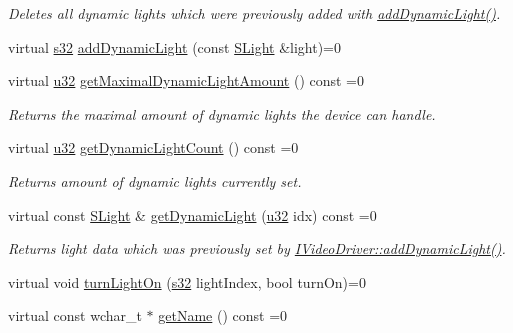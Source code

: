 \begin{DoxyCompactItemize}
\begin{DoxyCompactList}\small\item\em Deletes all dynamic lights which were previously added with \hyperlink{classirr_1_1video_1_1IVideoDriver_a813a39352eae26c4d30b5882618639be}{add\+Dynamic\+Light()}. \end{DoxyCompactList}\item 
virtual \hyperlink{namespaceirr_ac66849b7a6ed16e30ebede579f9b47c6}{s32} \hyperlink{classirr_1_1video_1_1IVideoDriver_a813a39352eae26c4d30b5882618639be}{add\+Dynamic\+Light} (const \hyperlink{structirr_1_1video_1_1SLight}{S\+Light} \&light)=0
\item 
virtual \hyperlink{namespaceirr_a0416a53257075833e7002efd0a18e804}{u32} \hyperlink{classirr_1_1video_1_1IVideoDriver_a242c9e9d469476eb28d55dc8a17b6622}{get\+Maximal\+Dynamic\+Light\+Amount} () const  =0
\begin{DoxyCompactList}\small\item\em Returns the maximal amount of dynamic lights the device can handle. \end{DoxyCompactList}\item 
virtual \hyperlink{namespaceirr_a0416a53257075833e7002efd0a18e804}{u32} \hyperlink{classirr_1_1video_1_1IVideoDriver_a4c85208c572dc8c37350bf0bd11583f8}{get\+Dynamic\+Light\+Count} () const  =0
\begin{DoxyCompactList}\small\item\em Returns amount of dynamic lights currently set. \end{DoxyCompactList}\item 
virtual const \hyperlink{structirr_1_1video_1_1SLight}{S\+Light} \& \hyperlink{classirr_1_1video_1_1IVideoDriver_aba32f5b6ba9bf1a9eabe54cf1649bb97}{get\+Dynamic\+Light} (\hyperlink{namespaceirr_a0416a53257075833e7002efd0a18e804}{u32} idx) const  =0
\begin{DoxyCompactList}\small\item\em Returns light data which was previously set by \hyperlink{classirr_1_1video_1_1IVideoDriver_a813a39352eae26c4d30b5882618639be}{I\+Video\+Driver\+::add\+Dynamic\+Light()}. \end{DoxyCompactList}\item 
virtual void \hyperlink{classirr_1_1video_1_1IVideoDriver_a3c26904f7d1bf0e37d51fe71562346a0}{turn\+Light\+On} (\hyperlink{namespaceirr_ac66849b7a6ed16e30ebede579f9b47c6}{s32} light\+Index, bool turn\+On)=0
\item 
virtual const wchar\+\_\+t $\ast$ \hyperlink{classirr_1_1video_1_1IVideoDriver_a3effb1d6dd3ea2f4b2671eabf9b15d6e}{get\+Name} () const  =0

\end{DoxyCompactItemize}
